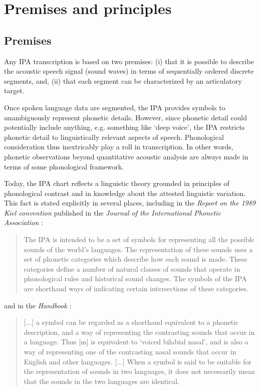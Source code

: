 
\section{Premises and principles}
\label{IPApremises-principles}
\subsection*{Premises}
\label{IPApremises}

Any IPA transcription is based on two premises: (i) that it is possible to
describe the acoustic speech signal (sound waves) in terms of sequentially
ordered discrete segments, and, (ii) that each segment can be characterized by
an articulatory target.

Once spoken language data are segmented, the IPA provides symbols to
unambiguously represent phonetic details. However, since phonetic detail could
potentially include anything, e.g. something like `deep voice', the IPA
restricts phonetic detail to linguistically relevant aspects of speech.
Phonological consideration thus inextricably play a roll in transcription. In
other words, phonetic observations beyond quantitative acoustic analysis are
always made in terms of some phonological framework.

Today, the IPA chart reflects a linguistic theory grounded in principles of
phonological contrast and in knowledge about the attested linguistic variation.
This fact is stated explicitly in several places, including in the
\textit{Report on the 1989 Kiel convention} published in the \textit{Journal of
the International Phonetic Association} \citep[67-68]{International1989report}:

\begin{quote}
The IPA is intended to be a set of symbols for representing all the possible 
sounds of the world's languages. The representation of these sounds uses a set 
of phonetic categories which describe how each sound is made. These categories 
define a number of natural classes of sounds that operate in phonological rules 
and historical sound changes. The symbols of the IPA are shorthand ways of 
indicating certain intersections of these categories.
\end{quote}

\noindent and in the \textit{Handbook} \citep[18]{IPA1999}: 

\begin{quote}
[...] a symbol can be regarded as a shorthand equivalent to a phonetic
description, and a way of representing the contrasting sounds that occur in a
language. Thus [m] is equivalent to `voiced bilabial nasal', and is also a way
of representing one of the contrasting nasal sounds that occur in English and
other languages. [...] When a symbol is said to be suitable for the
representation of sounds in two languages, it does not necessarily mean that the
sounds in the two languages are identical.
\end{quote}

